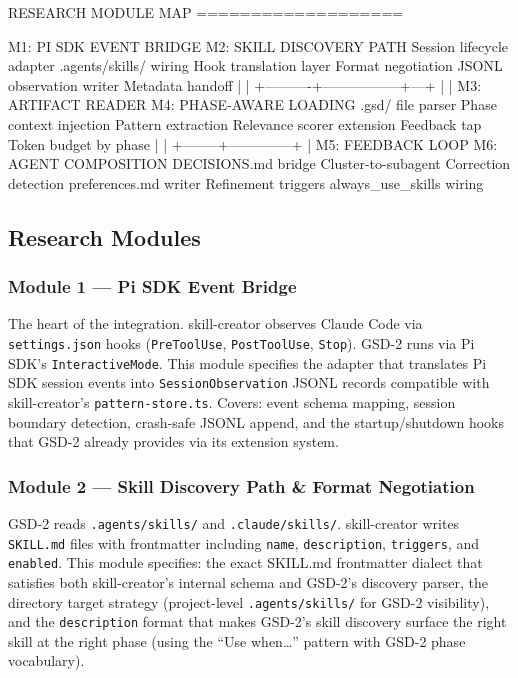 \documentclass[11pt,letterpaper]{article}
\begin{document}
\begin{asciibox}
RESEARCH MODULE MAP
===================

  M1: PI SDK EVENT BRIDGE         M2: SKILL DISCOVERY PATH
  Session lifecycle adapter        .agents/skills/ wiring
  Hook translation layer           Format negotiation
  JSONL observation writer         Metadata handoff
        |                                |
        +----------+-----------------+---+
                   |                 |
         M3: ARTIFACT READER    M4: PHASE-AWARE LOADING
         .gsd/ file parser       Phase context injection
         Pattern extraction      Relevance scorer extension
         Feedback tap            Token budget by phase
                |                       |
                +--------+--------------+
                         |
           M5: FEEDBACK LOOP       M6: AGENT COMPOSITION
           DECISIONS.md bridge      Cluster-to-subagent
           Correction detection     preferences.md writer
           Refinement triggers      always_use_skills wiring
\end{asciibox}

\subsection{Research Modules}

\subsubsection{Module 1 --- Pi SDK Event Bridge}

The heart of the integration. skill-creator observes Claude Code via \texttt{settings.json} hooks (\texttt{PreToolUse}, \texttt{PostToolUse}, \texttt{Stop}). GSD-2 runs via Pi SDK's \texttt{InteractiveMode}. This module specifies the adapter that translates Pi SDK session events into \texttt{SessionObservation} JSONL records compatible with skill-creator's \texttt{pattern-store.ts}. Covers: event schema mapping, session boundary detection, crash-safe JSONL append, and the startup/shutdown hooks that GSD-2 already provides via its extension system.

\subsubsection{Module 2 --- Skill Discovery Path \& Format Negotiation}

GSD-2 reads \texttt{.agents/skills/} and \texttt{.claude/skills/}. skill-creator writes \texttt{SKILL.md} files with frontmatter including \texttt{name}, \texttt{description}, \texttt{triggers}, and \texttt{enabled}. This module specifies: the exact SKILL.md frontmatter dialect that satisfies both skill-creator's internal schema and GSD-2's discovery parser, the directory target strategy (project-level \texttt{.agents/skills/} for GSD-2 visibility), and the \texttt{description} format that makes GSD-2's skill discovery surface the right skill at the right phase (using the ``Use when\ldots'' pattern with GSD-2 phase vocabulary).
\end{document}
